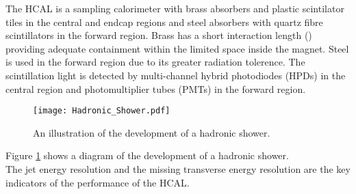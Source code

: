 The HCAL is a sampling calorimeter with brass absorbers and plastic scintilator
tiles in the central and endcap regions and steel absorbers with quartz fibre 
scintillators in the forward region. Brass has a short interaction length () 
providing adequate containment within the limited space inside the magnet. Steel 
is used in the forward region due to its greater radiation tolerence. The 
scintillation light is detected by multi-channel hybrid photodiodes (HPDs) in 
the central region and photomultiplier tubes (PMTs) in the forward region. \\

\begin{figure}
\begin{center}
\texttt{[image: Hadronic\_Shower.pdf]}
\end{center}
\caption{An illustration of the development of a hadronic shower.}
\label{fig:hadronic_shower}
\end{figure}

Figure \ref{fig:hadronic_shower} shows a diagram of the development of a
hadronic shower. \\

The jet energy resolution and the missing transverse energy resolution are the 
key indicators of the performance of the HCAL. \\

%
%
%


